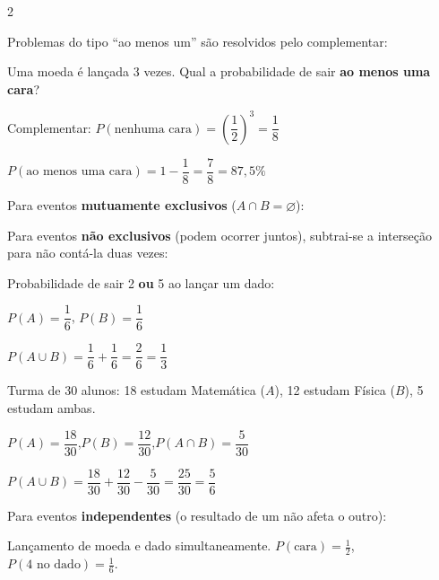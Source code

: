 \documentclass[12pt]{article}
\begin{document}
\begin{multicols}{2}

Problemas do tipo ``ao menos um'' são resolvidos pelo complementar:



Uma moeda é lançada 3 vezes. Qual a probabilidade de sair \textbf{ao menos uma cara}?

Complementar: $P(\text{nenhuma cara}) = \left(\dfrac{1}{2}\right)^3 = \dfrac{1}{8}$
\vspace{5px}

$P(\text{ao menos uma cara}) = 1 - \dfrac{1}{8} = \dfrac{7}{8} = 87{,}5\%$


Para eventos \textbf{mutuamente exclusivos} ($A \cap B = \varnothing$):


Para eventos \textbf{não exclusivos} (podem ocorrer juntos), subtrai-se a interseção para não contá-la duas vezes:



Probabilidade de sair 2 \textbf{ou} 5 ao lançar um dado:

$P(A) = \dfrac{1}{6}$, $P(B) = \dfrac{1}{6}$
\vspace{5px}

$P(A \cup B) = \dfrac{1}{6} + \dfrac{1}{6} = \dfrac{2}{6} = \dfrac{1}{3}$


Turma de 30 alunos: 18 estudam Matemática ($A$), 12 estudam Física ($B$), 5 estudam ambas.

$P(A)=\dfrac{18}{30}$,\quad $P(B)=\dfrac{12}{30}$,\quad $P(A \cap B)=\dfrac{5}{30}$
\vspace{5px}

$P(A \cup B) = \dfrac{18}{30}+\dfrac{12}{30}-\dfrac{5}{30} = \dfrac{25}{30} = \dfrac{5}{6}$


Para eventos \textbf{independentes} (o resultado de um não afeta o outro):



Lançamento de moeda e dado simultaneamente. $P(\text{cara}) = \frac{1}{2}$, $P(\text{4 no dado}) = \frac{1}{6}$.


\end{multicols}
\end{document}
